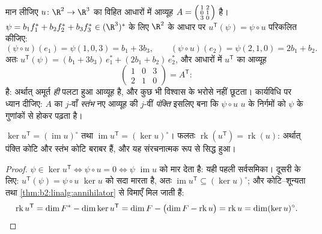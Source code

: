 \begin{example}[परिवर्त, प्रविष्टि-दर-प्रविष्टि]\label{ex:b2:linalg:transposework}
मान लीजिए $u \colon \R^2 \to \R^3$ का विहित आधारों में आव्यूह $A =
\begin{psmallmatrix} 1 & 2\\ 0 & 1\\ 3 & 0\end{psmallmatrix}$ है। $\psi = b_1f_1^* + b_2f_2^* + b_3f_3^*
\in (\R^3)^*$ के लिए $\R^2$ के
आधार पर $u^{\mathsf T}(\psi) = \psi \circ u$ परिकलित कीजिए:
\[
(\psi \circ u)(e_1) = \psi(1, 0, 3) = b_1 + 3b_3,
\qquad
(\psi \circ u)(e_2) = \psi(2, 1, 0) = 2b_1 + b_2 .
\]
अतः $u^{\mathsf T}(\psi) = (b_1 + 3b_3)\,e_1^* + (2b_1 +
b_2)\,e_2^*$, और  आधारों में $u^{\mathsf T}$ का आव्यूह
\[
\begin{pmatrix} 1 & 0 & 3\\ 2 & 1 & 0\end{pmatrix}
= A^{\mathsf T} :
\]
है: अर्थात् अमूर्त  \emph{ही} पलटा हुआ आव्यूह है, और कुछ भी
विश्वास के भरोसे नहीं छूटता। कार्यविधि पर ध्यान दीजिए: $A$ का
$j$-वाँ \emph{स्तंभ} नए आव्यूह की $j$-वीं \emph{पंक्ति} इसलिए बना कि
$\psi \circ u$ $u$ के निर्गमों को $\psi$ के गुणांकों से होकर पढ़ता है।
\end{example}

\begin{proposition}\label{prop:b2:linalg:transposerank}
$\ker u^{\mathsf T} = (\operatorname{im} u)^{\circ}$ तथा $\operatorname{im} u^{\mathsf T} = (\ker u)^{\circ}$। फलतः $\operatorname{rk}(u^{\mathsf T}) = \operatorname{rk}(u)$: अर्थात् पंक्ति कोटि और स्तंभ कोटि बराबर हैं,
और यह संरचनात्मक रूप से सिद्ध हुआ।
\end{proposition}

\begin{proof}
$\psi \in \ker u^{\mathsf T} \iff \psi \circ u = 0 \iff \psi$ $\operatorname{im} u$ को मार देता है: यही पहली सर्वसमिका। दूसरी के लिए: $u^{\mathsf
T}(\psi) = \psi \circ u$ $\ker u$ को
सदा मारता है, अतः $\operatorname{im} u^{\mathsf T} \subseteq (\ker u)^\circ$; और कोटि--शून्यता तथा \cref{thm:b2:linalg:annihilator} से विमाएँ मिल जाती
हैं:
\[
\operatorname{rk} u^{\mathsf T} = \dim F^* - \dim\ker u^{\mathsf T}
= \dim F - \bigl(\dim F - \operatorname{rk} u\bigr)
= \operatorname{rk} u
= \dim (\ker u)^{\circ} . \qedhere
\]
\end{proof}

